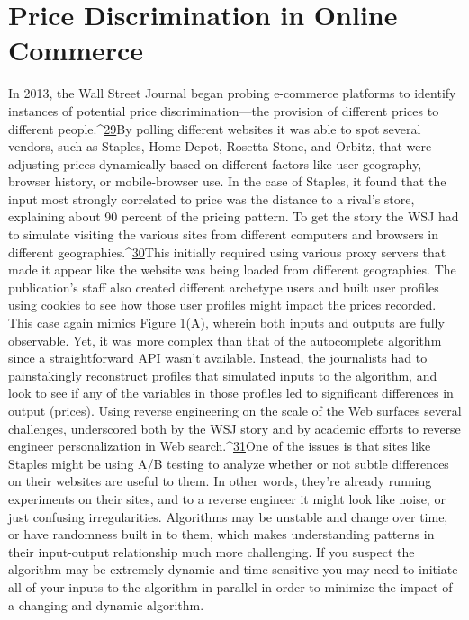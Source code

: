 \section{Price Discrimination in Online Commerce }
In 2013, the Wall Street Journal began probing e-commerce platforms to identify instances of potential price discrimination—the provision of different prices to different people.^{\href{#endnotes}{29}}By polling different websites it was able to spot several vendors, such as Staples, Home Depot, Rosetta Stone, and Orbitz, that were adjusting prices dynamically based on different factors like user geography, browser history, or mobile-browser use. In the case of Staples, it found that the input most strongly correlated to price was the distance to a rival's store, explaining about 90 percent of the pricing pattern. 
To get the story the WSJ had to simulate visiting the various sites from different computers and browsers in different geographies.^{\href{#endnotes}{30}}This initially required using various proxy servers that made it appear like the website was being loaded from different geographies. The publication's staff also created different archetype users and built user profiles using cookies to see how those user profiles might impact the prices recorded. This case again mimics Figure 1(A), wherein both inputs and outputs are fully observable. Yet, it was more complex than that of the autocomplete algorithm since a straightforward API wasn't available. Instead, the journalists had to painstakingly reconstruct profiles that simulated inputs to the algorithm, and look to see if any of the variables in those profiles led to significant differences in output (prices). 
Using reverse engineering on the scale of the Web surfaces several challenges, underscored both by the WSJ story and by academic efforts to reverse engineer personalization in Web search.^{\href{#endnotes}{31}}One of the issues is that sites like Staples might be using A/B testing to analyze whether or not subtle differences on their websites are useful to them. In other words, they're already running experiments on their sites, and to a reverse engineer it might look like noise, or just confusing irregularities. Algorithms may be unstable and change over time, or have randomness built in to them, which makes understanding patterns in their input-output relationship much more challenging. If you suspect the algorithm may be extremely 
dynamic and time-sensitive you may need to initiate all of your inputs to the algorithm in parallel in order to minimize the impact of a changing and dynamic algorithm. 
